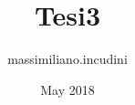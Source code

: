 \documentclass[11pt, a4paper]{book}
\title{Tesi3}
\author{massimiliano.incudini }
\date{May 2018}
\begin{document}


\begin{abstract}
\lipsum[1]
\end{abstract}

{ \renewcommand{\cleardoublepage}{} \tableofcontents \clearpage \listoffigures \listoftables}






\printbibliography
\end{document}
